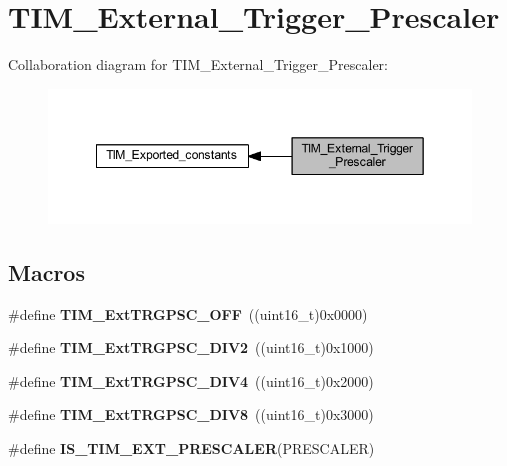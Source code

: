 \hypertarget{group___t_i_m___external___trigger___prescaler}{}\section{T\+I\+M\+\_\+\+External\+\_\+\+Trigger\+\_\+\+Prescaler}
\label{group___t_i_m___external___trigger___prescaler}
Collaboration diagram for T\+I\+M\+\_\+\+External\+\_\+\+Trigger\+\_\+\+Prescaler\+:\nopagebreak
\begin{figure}[H]
\begin{center}
\leavevmode
\includegraphics[width=349pt]{group___t_i_m___external___trigger___prescaler}
\end{center}
\end{figure}
\subsection*{Macros}
\begin{DoxyCompactItemize}
\item 
\mbox{\label{group___t_i_m___external___trigger___prescaler_ga1b21757d5d1b708edca7e20481797e96}} 
\#define {\bfseries T\+I\+M\+\_\+\+Ext\+T\+R\+G\+P\+S\+C\+\_\+\+O\+FF}~((uint16\+\_\+t)0x0000)
\item 
\mbox{\label{group___t_i_m___external___trigger___prescaler_ga446ed7f1bc28bcb295c43886da582e47}} 
\#define {\bfseries T\+I\+M\+\_\+\+Ext\+T\+R\+G\+P\+S\+C\+\_\+\+D\+I\+V2}~((uint16\+\_\+t)0x1000)
\item 
\mbox{\label{group___t_i_m___external___trigger___prescaler_ga1de0031af7654fac2f29705f1da146c6}} 
\#define {\bfseries T\+I\+M\+\_\+\+Ext\+T\+R\+G\+P\+S\+C\+\_\+\+D\+I\+V4}~((uint16\+\_\+t)0x2000)
\item 
\mbox{\label{group___t_i_m___external___trigger___prescaler_gac2fe5014d69a93ce0a22b9f3f5a7d19a}} 
\#define {\bfseries T\+I\+M\+\_\+\+Ext\+T\+R\+G\+P\+S\+C\+\_\+\+D\+I\+V8}~((uint16\+\_\+t)0x3000)
\item 
\#define {\bfseries I\+S\+\_\+\+T\+I\+M\+\_\+\+E\+X\+T\+\_\+\+P\+R\+E\+S\+C\+A\+L\+ER}(P\+R\+E\+S\+C\+A\+L\+ER)
\end{DoxyCompactItemize}


